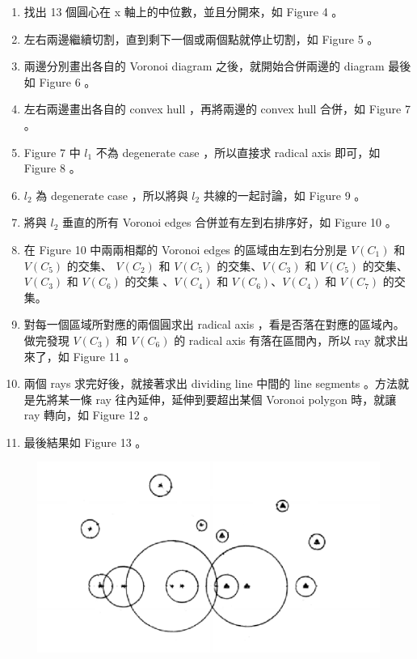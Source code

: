 \documentclass[12pt]{article}
\begin{document}
\begin{CJK}{UTF8}{bkai}
\begin{enumerate}
\item 找出 13 個圓心在 x 軸上的中位數，並且分開來，如 Figure 4 。
\item 左右兩邊繼續切割，直到剩下一個或兩個點就停止切割，如 Figure 5 。
\item 兩邊分別畫出各自的 Voronoi diagram 之後，就開始合併兩邊的 diagram
最後如 Figure 6 。
\item 左右兩邊畫出各自的 convex hull ，再將兩邊的 convex hull 合併，如 Figure 7 。
\item Figure 7 中 $l_1$ 不為 degenerate case ，所以直接求 radical axis 即可，如
 Figure 8 。
\item $l_2$ 為 degenerate case ，所以將與 $l_2$ 共線的一起討論，如 Figure 9 。
\item 將與 $l_2$ 垂直的所有 Voronoi edges 合併並有左到右排序好，如 Figure 10 。
\item 在 Figure 10 中兩兩相鄰的 Voronoi edges 的區域由左到右分別是 $V(C_1)$ 和 $V(C_5)$ 的交集、
 $V(C_2)$ 和 $V(C_5)$ 的交集、$V(C_3)$ 和 $V(C_5)$ 的交集、 $V(C_3)$ 和 $V(C_6)$ 的交集
、$V(C_4)$ 和 $V(C_6)$、$V(C_4)$ 和 $V(C_7)$ 的交集。
\item 對每一個區域所對應的兩個圓求出 radical axis ，看是否落在對應的區域內。做完發現
 $V(C_3)$ 和 $V(C_6)$ 的 radical axis 有落在區間內，所以 ray 就求出來了，如 Figure 11 。
\item 兩個 rays 求完好後，就接著求出 dividing line 中間的 line segments 。方法就是先將某一條
 ray 往內延伸，延伸到要超出某個 Voronoi polygon 時，就讓 ray 轉向，如 Figure 12 。
\item 最後結果如 Figure 13 。

\end{enumerate}

\begin{figure}[h]
\includegraphics[scale=0.4]{figure3.eps}
\caption{}
\end{figure}


\end{CJK}
\end{document}
